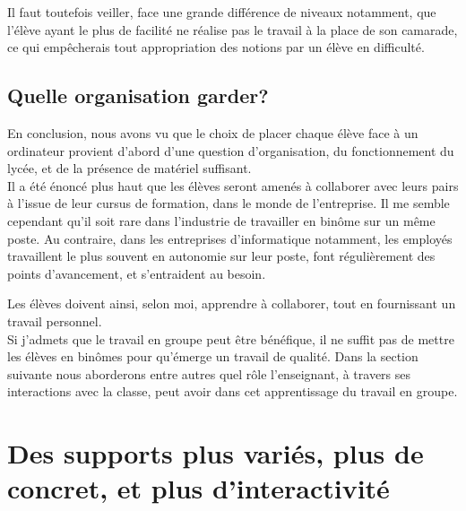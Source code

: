 \documentclass[pdftex,a4paper,12pt]{article}
\begin{document}
	Il faut toutefois veiller, face une grande différence de niveaux notamment,
	que l'élève ayant le plus de facilité ne réalise pas le travail à la place de son camarade, 
	ce qui empêcherais tout appropriation des notions par un élève en difficulté.

	\subsection{Quelle organisation garder?}
	En conclusion, nous avons vu que le choix de placer chaque élève face à un ordinateur provient d'abord d'une question d'organisation, 
	du fonctionnement du lycée, et de la présence de matériel suffisant.\\

	Il a été énoncé plus haut que les élèves seront amenés à collaborer avec leurs pairs à l'issue de leur cursus de formation, dans le monde de l'entreprise.
	Il me semble cependant qu'il soit rare dans l'industrie de travailler en binôme sur un même poste.
	Au contraire, dans les entreprises d'informatique notamment, les employés travaillent le plus souvent en autonomie sur leur poste, 
	font régulièrement des points d'avancement, et s'entraident au besoin.
	
	Les élèves doivent ainsi, selon moi, apprendre à collaborer, tout en fournissant un travail personnel.\\
	
	Si j'admets que le travail en groupe peut être bénéfique, il ne suffit pas de mettre les élèves en binômes pour qu'émerge un travail de qualité.
	Dans la section suivante nous aborderons entre autres quel rôle l'enseignant, à travers ses interactions avec la classe, peut avoir dans cet apprentissage du travail en groupe.

	\section{Des supports plus variés, plus de concret, et plus d'interactivité}
\end{document}
